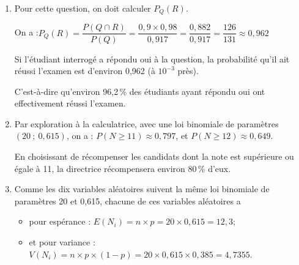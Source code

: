 \begin{enumerate}
\begin{enumerate}
		\item On sait que $P(Q)=0,917$, or, comme $R$ et $\overline{R}$ partitionnent l'univers, en vertu de la loi des probabilités totales, on a également :

		$\aligned P(Q) &= P\big(Q \cap R\big) + P\left(Q \cap \overline{R}\right)\\
		&= x\times 0,98 + (1 -x) \times 0,35\\
		&= 0,98x + 0,35 - 0,35x\\
		&= 0,63x + 0,35		\endaligned$

		Puisque la probabilité de $Q$ est unique, on peut donc écrire, puis résoudre l'équation :
		\quad
		$\aligned[t] 0,63x + 0,35 = 0,917 &\iff 0,63x = 0,567\\
		&\iff x = \dfrac{0,567}{0,63}\\
		&\iff x = 0,9\endaligned$

La solution de l'équation est donc 0,9 : la probabilité que l'étudiant ait réussi son examen est donc de 0,9 (ou bien : 90\,\% des étudiants ont réussi leur examen).
	\end{enumerate}

	\item Pour cette question, on doit calculer $P_Q(R)$.

	On a :\quad $P_Q(R) = \dfrac{P(Q \cap R)}{P(Q)} = \dfrac{0,9 \times 0,98}{0,917}=\dfrac{0,882}{0,917}=\dfrac{126}{131}\approx0,962$

Si l'étudiant interrogé a répondu \og oui\fg{}  à la question, la probabilité qu'il ait réussi l'examen est d'environ 0,962 (à $10^{-3}$ près).

C'est-à-dire qu'environ 96,2\,\% des étudiants ayant répondu \og oui\fg{} ont effectivement réussi l'examen.

	\item Par exploration à la calculatrice, avec une loi binomiale de paramètres $(20~;~0,615)$, on a :\quad
	$P(N\geqslant 11)\approx 0,797$, \quad et \quad $P(N \geqslant 12) \approx 0,649$.

En choisissant de récompenser les candidats dont la note est supérieure ou égale à 11, la directrice récompensera environ 80\,\% d'eux.

	\item Comme les dix variables aléatoires suivent la même loi binomiale de paramètres 20 et 0,615, chacune de ces variables aléatoires a

	\begin{itemize}[label=\textbullet]
		\item pour espérance : \quad $E(N_i) = n \times p = 20 \times 0,615 = 12,3$;
		\item et pour variance : \quad $V(N_i) = n \times p \times (1-p) = 20 \times 0,615 \times 0,385 = 4,7355$.
	\end{itemize}


\end{enumerate}

